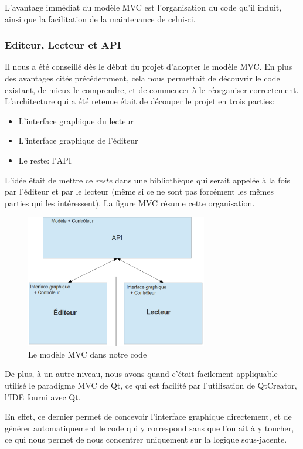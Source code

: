 L'avantage immédiat du modèle \ac{MVC} est l'organisation du code qu'il induit, ainsi que la facilitation de la maintenance de celui-ci.

\subsubsection{Editeur, Lecteur et \ac{API}}

Il nous a été conseillé dès le début du projet d'adopter le modèle \ac{MVC}. En plus des avantages cités précédemment, cela nous permettait de découvrir le code existant, de mieux le comprendre, et de commencer à le réorganiser correctement. L'architecture qui a été retenue était de découper le projet en trois parties:
\begin{itemize}
 \item L'interface graphique du lecteur
 \item L'interface graphique de l'éditeur
 \item Le reste: l'\ac{API}
\end{itemize}
L'idée était de mettre ce \textit{reste} dans une bibliothèque qui serait appelée à la fois par l'éditeur et par le lecteur (même si ce ne sont pas forcément les mêmes parties qui les intéressent). La figure \ac{MVC} résume cette organisation.

\begin{figure}[H]
\begin{center}
\includegraphics[width=300px]{mvc.png}
\caption{Le modèle MVC dans notre code}
\label{mvc}
\end{center}
\end{figure}


De plus, à un autre niveau, nous avons quand c'était facilement appliquable utilisé le paradigme \ac{MVC} de Qt, ce qui est facilité
par l'utilisation de QtCreator, l'IDE fourni avec Qt.

En effet, ce dernier permet de concevoir l'interface graphique directement, et de générer automatiquement le code qui y
correspond sans que l'on ait à y toucher, ce qui nous permet de nous concentrer uniquement sur la logique sous-jacente.

